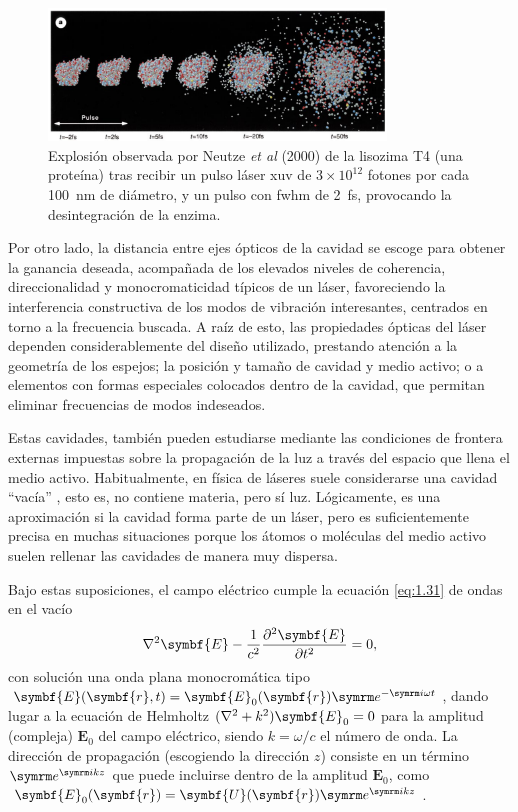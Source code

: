 \begin{figure}[htbp]
  \centering
  \includegraphics[width=0.8\textwidth]{Figuras/ch1_explyso}
  \caption{Explosión observada por Neutze \emph{et al} (2000) \autocite{Neutze2000} de la lisozima T4 (una proteína) tras recibir un pulso láser \acrshort{xuv} de $3 \times 10^{12}$ fotones por cada \qty{100}{nm} de diámetro, y un pulso con \acrshort{fwhm} de \qty{2}{fs}, provocando la desintegración de la enzima.}
  \label{fig:1.10}
\end{figure}

Por otro lado, la distancia entre ejes ópticos de la cavidad se escoge para obtener la ganancia deseada, acompañada de los elevados niveles de coherencia, direccionalidad y monocromaticidad típicos de un láser, favoreciendo la interferencia constructiva \autocite{Hecht2016} de los modos de vibración interesantes, centrados en torno a la frecuencia buscada. A raíz de esto, las propiedades ópticas del láser dependen considerablemente del diseño utilizado, prestando atención a la geometría de los espejos; la posición y tamaño de cavidad y medio activo; o a elementos con formas especiales colocados dentro de la cavidad, que permitan eliminar frecuencias de modos indeseados.

Estas cavidades, también pueden estudiarse mediante las condiciones de frontera externas impuestas sobre la propagación de la luz a través del espacio que llena el medio activo. Habitualmente, en física de láseres suele considerarse una cavidad \enquote{vacía} \autocite{Milonni1988}, esto es, no contiene materia, pero sí luz. Lógicamente, es una aproximación si la cavidad forma parte de un láser, pero es suficientemente precisa en muchas situaciones porque los átomos o moléculas del medio activo suelen rellenar las cavidades de manera muy dispersa. 

Bajo estas suposiciones, el campo eléctrico cumple la ecuación \eqref{eq:1.31} de ondas en el vacío 
\begin{equation}\label{eq:1.31}
  \laplacian \symbf{E} - \frac{1}{c^{2}}\pdvN{\symbf{E}}{t}{2} = 0,
\end{equation}
con solución una onda plana monocromática tipo $\symbf{E}(\symbf{r},t) = \symbf{E}_{0}(\symbf{r})\eu^{-\iu \omega t}$, dando lugar a la ecuación de Helmholtz $(\laplacian + k^{2}) \symbf{E}_{0} = 0$ para la amplitud (compleja) $\symbf{E}_{0}$ del campo eléctrico, siendo $k=\omega/c$ el número de onda. La dirección de propagación (escogiendo la dirección $z$) consiste en un término $\eu^{\iu kz}$ que puede incluirse dentro de la amplitud $\symbf{E}_{0}$, como $\symbf{E}_{0}(\symbf{r}) = \symbf{U}(\symbf{r})\eu^{\iu  kz}$. 

